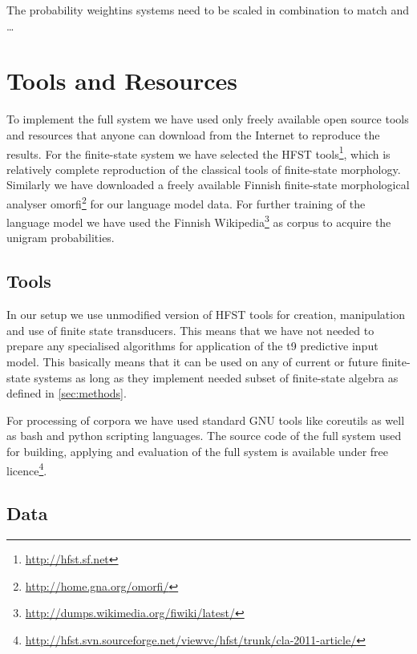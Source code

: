 \documentclass[a4paper,conference]{IEEEtran}
\begin{document}
The probability weightins systems need to be scaled in combination to match and
\ldots


\section{Tools and Resources}
\label{sec:tools}

To implement the full system we have used only freely available open source
tools and resources that anyone can download from the Internet to reproduce the
results. For the finite-state system we have selected the HFST
tools\footnote{\url{http://hfst.sf.net}}, which is relatively complete
reproduction of the classical tools of finite-state
morphology\cite{beesley/2003}. Similarly we have downloaded a freely available
Finnish finite-state morphological analyser
omorfi\footnote{\url{http://home.gna.org/omorfi/}} for our language model
data\cite{pirinen/2011/nodalida}. For further training of the language model we
have used the Finnish
Wikipedia\footnote{\url{http://dumps.wikimedia.org/fiwiki/latest/}} as corpus
to acquire the unigram probabilities\cite{pirinen/2010/lrec}.

\subsection{Tools}

In our setup we use unmodified version of HFST tools for creation, manipulation
and use of finite state transducers\cite{hfst/2011}. This means that we have
not needed to prepare any specialised algorithms for application of the t9
predictive input model. This basically means that it can be used on any of
current or future finite-state systems as long as they implement needed subset
of finite-state algebra as defined in \ref{sec:methods}.

For processing of corpora we have used standard GNU tools like coreutils as
well as bash and python scripting languages. The source code of the full system
used for building, applying and evaluation of the full system is available
under free
licence\footnote{\url{http://hfst.svn.sourceforge.net/viewvc/hfst/trunk/cla-2011-article/}}.

\subsection{Data}
\label{sec:data}
\end{document}
